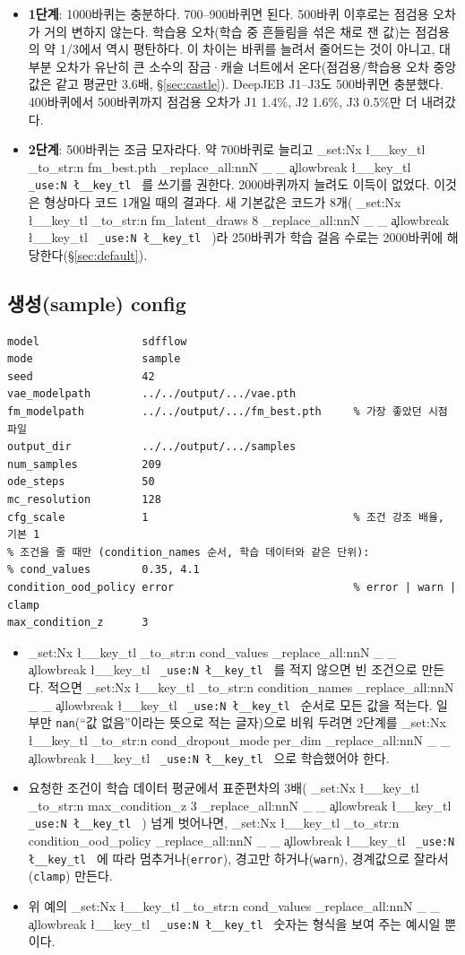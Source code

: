 \documentclass[11pt]{article}
\DeclareRobustCommand{\key}[1]{
  \tl_set:Nx \l__key_tl { \tl_to_str:n {#1} }
  \regex_replace_all:nnN { \_ } { \cO\_ \c{allowbreak} } \l__key_tl
  \texttt{ \tl_use:N \l__key_tl }
}
\begin{document}
\begin{itemize}
\item \textbf{1단계}: 1000바퀴는 충분하다. 700--900바퀴면 된다. 500바퀴 이후로는 점검용 오차가 거의 변하지 않는다.
학습용 오차(학습 중 흔들림을 섞은 채로 잰 값)는 점검용의 약 1/3에서 역시 평탄하다. 이 차이는 바퀴를 늘려서 줄어드는 것이 아니고,
대부분 오차가 유난히 큰 소수의 잠금·캐슬 너트에서 온다(점검용/학습용 오차 중앙값은 같고 평균만 3.6배, \S\ref{sec:castle}). DeepJEB J1--J3도 500바퀴면 충분했다.
400바퀴에서 500바퀴까지 점검용 오차가 J1 1.4\%, J2 1.6\%, J3 0.5\%만 더 내려갔다.
\item \textbf{2단계}: 500바퀴는 조금 모자라다. 약 700바퀴로 늘리고 \key{fm_best.pth}를 쓰기를 권한다. 2000바퀴까지 늘려도 이득이 없었다.
이것은 형상마다 코드 1개일 때의 결과다. 새 기본값은 코드가 8개(\key{fm_latent_draws 8})라 250바퀴가 학습 걸음 수로는 2000바퀴에 해당한다(\S\ref{sec:default}).
\end{itemize}

\subsection{생성(sample) config}

\begin{Verbatim}[fontsize=\small, frame=single, framesep=2mm]
model                sdfflow
mode                 sample
seed                 42
vae_modelpath        ../../output/.../vae.pth
fm_modelpath         ../../output/.../fm_best.pth     % 가장 좋았던 시점 파일
output_dir           ../../output/.../samples
num_samples          209
ode_steps            50
mc_resolution        128
cfg_scale            1                                % 조건 강조 배율, 기본 1
% 조건을 줄 때만 (condition_names 순서, 학습 데이터와 같은 단위):
% cond_values        0.35, 4.1
condition_ood_policy error                            % error | warn | clamp
max_condition_z      3
\end{Verbatim}

\begin{itemize}
\item \key{cond_values}를 적지 않으면 빈 조건으로 만든다. 적으면 \key{condition_names} 순서로 모든 값을 적는다.
일부만 \texttt{nan}(``값 없음''이라는 뜻으로 적는 글자)으로 비워 두려면 2단계를 \key{cond_dropout_mode per_dim}으로 학습했어야 한다.
\item 요청한 조건이 학습 데이터 평균에서 표준편차의 3배(\key{max_condition_z 3}) 넘게 벗어나면, \key{condition_ood_policy}에 따라
멈추거나(\texttt{error}), 경고만 하거나(\texttt{warn}), 경계값으로 잘라서(\texttt{clamp}) 만든다.
\item 위 예의 \key{cond_values} 숫자는 형식을 보여 주는 예시일 뿐이다.
\end{itemize}
\end{document}
